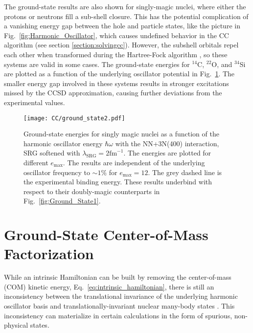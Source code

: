 \documentclass[thesis.tex]{subfiles}
\begin{document}
The ground-state results are also shown for singly-magic nuclei, where either the protons or neutrons fill a sub-shell closure.  This has the potential complication of a vanishing energy gap between the hole and particle states, like the picture in Fig.\ \ref{fig:Harmonic_Oscillator}, which causes undefined behavior in the CC algorithm (see section \ref{section:solvingcc}).  However, the subshell orbitals repel each other when transformed during the Hartree-Fock algorithm \cite{LEVIT1999}, so these systems are valid in some cases.  The ground-state energies for ${}^{14}$C, ${}^{22}$O, and ${}^{34}$Si are plotted as a function of the underlying oscillator potential in Fig.\ \ref{fig:Ground_State2}.  The smaller energy gap involved in these systems results in stronger excitations missed by the CCSD approximation, causing further deviations from the experimental values.
\begin{figure}[h!]
  \centering
  \texttt{[image: CC/ground\_state2.pdf]}
  \caption{Ground-state energies for singly magic nuclei as a function of the harmonic oscillator energy $\hbar\omega$ with the NN+3N(400) interaction, SRG softened with $\lambda_{\mathrm{SRG}}=2\mathrm{fm}^{-1}$.  The energies are plotted for different $e_\mathrm{max}$.  The results are independent of the underlying oscillator frequency to $\sim 1\%$ for $e_\mathrm{max}=12$.  The grey dashed line is the experimental binding energy.  These results underbind with respect to their doubly-magic counterparts in Fig.\ \ref{fig:Ground_State1}.}
  \label{fig:Ground_State2}
\end{figure}

\section{Ground-State Center-of-Mass Factorization} \label{section:CoM}
While an intrinsic Hamiltonian can be built by removing the center-of-mass (COM) kinetic energy, Eq.\ \eqref{eq:intrinsic_hamiltonian}, there is still an inconsistency between the translational invariance of the underlying harmonic oscillator basis and translationally-invariant nuclear many-body states \cite{LIPKIN1958,GLOECKNER1974313}.  This inconsistency can materialize in certain calculations in the form of spurious, non-physical states.
\end{document}
